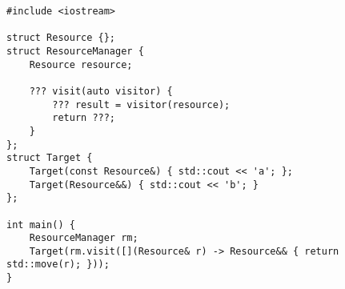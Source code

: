 \begin{lstlisting}[title=\href{https://godbolt.org/z/b-6EBB}{\texttt{godbolt.org/z/b-6EBB}}]
#include <iostream>

struct Resource {};
struct ResourceManager {
    Resource resource;

    ??? visit(auto visitor) {
        ??? result = visitor(resource);
        return ???;
    }
};
struct Target {
    Target(const Resource&) { std::cout << 'a'; };
    Target(Resource&&) { std::cout << 'b'; }
};

int main() {
    ResourceManager rm;
    Target(rm.visit([](Resource& r) -> Resource&& { return std::move(r); }));
}
\end{lstlisting}
